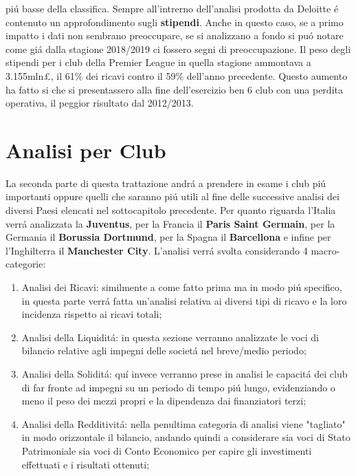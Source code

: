 \documentclass[
    corpo=12pt,
    oneside,
    evenboxes,
    tipotesi=triennale,
    stile=classica,
    oldstyle,
    autoretitolo,
    greek,
]{toptesi}
\begin{document}
\begin{interlinea}{1.5}
pi\'u basse della classifica.\newline
Sempre all'intrerno dell'analisi prodotta da Deloitte \'e contenuto un approfondimento sugli \textbf{stipendi}. Anche in questo caso, se a
primo impatto i dati non sembrano preoccupare, se si analizzano a fondo si pu\'o notare come gi\'a dalla stagione 2018/2019 ci fossero segni
di preoccupazione. Il peso degli stipendi per i club della Premier League in quella stagione ammontava a 3.155mln£, il 61\% dei ricavi contro il 
59\% dell'anno precedente. Questo aumento ha fatto si che si presentassero alla fine dell'esercizio ben 6 club con una perdita operativa, il 
peggior risultato dal 2012/2013.\newline
\section{Analisi per Club}
La seconda parte di questa trattazione andr\'a a prendere in esame i club pi\'u importanti oppure quelli che saranno pi\'u utili al fine 
delle successive analisi dei diversi Paesi elencati nel sottocapitolo precedente. Per quanto riguarda l'Italia verr\'a analizzata la \textbf{Juventus},
per la Francia il \textbf{Paris Saint Germain}, per la Germania il \textbf{Borussia Dortmund}, per la Spagna il \textbf{Barcellona} e infine per l'Inghilterra il 
\textbf{Manchester City}.\newline
L'analisi verr\'a svolta considerando 4 macro-categorie:
\begin{enumerate}
    \item Analisi dei Ricavi: similmente a come fatto prima ma in modo pi\'u specifico, in questa parte verr\'a fatta un'analisi relativa
        ai diversi tipi di ricavo e la loro incidenza rispetto ai ricavi totali; 
    \item Analisi della Liquidit\'a: in questa sezione verranno analizzate le voci di bilancio relative agli impegni delle societ\'a
        nel breve/medio periodo;
    \item Analisi della Solidit\'a: qu\'i invece verranno prese in analisi le capacit\'a dei club di far fronte ad impegni su un periodo di
        tempo pi\'u lungo, evidenziando o meno il peso dei mezzi propri e la dipendenza dai finanziatori terzi;
    \item Analisi della Redditivit\'a: nella penultima categoria di analisi viene "tagliato" in modo orizzontale il bilancio, andando quindi
        a considerare sia voci di Stato Patrimoniale sia voci di Conto Economico per capire gli investimenti effettuati e i risultati ottenuti;
\end{enumerate} 

\end{interlinea}
\end{document}
